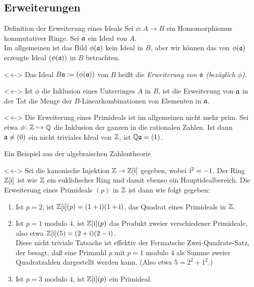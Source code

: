 \subsection{Erweiterungen}

\begin{frame}{Definition der Erweiterung eines Ideals}
	Sei \(\phi\colon A \to B\) ein Homomorphismus kommutativer Ringe.
	Sei \(\mathfrak{a}\) ein Ideal von \(A\).
	\\
	Im allgemeinen ist das Bild \(\phi(\mathfrak{a})\) kein Ideal in \(B\), aber wir 
	können das von \(\phi(\mathfrak{a})\) erzeugte Ideal \((\phi(\mathfrak{a}))\) in
	\(B\) betrachten.
	\begin{definition}<+->
		Das Ideal \(B \mathfrak{a} := (\phi(\mathfrak{a}))\) von \(B\) heißt die
		\emph{Erweiterung von \(\mathfrak{a}\) (bezüglich \(\phi\))}.
	\end{definition}
	\begin{remark}<+->
		Ist \(\phi\) die Inklusion eines Unterringes \(A\) in \(B\), ist die 
		Erweiterung von \(\mathfrak{a}\) in der Tat die Menge der
		\(B\)\nobreakdash-Linearkombinationen von Elementen in \(\mathfrak{a}\).
	\end{remark}
	\begin{example}<+->
		Die Erweiterung eines Primideals ist im allgemeinen nicht mehr prim.
		Sei etwa \(\phi\colon \mathbb Z \hookrightarrow \mathbb Q\) die Inklusion der ganzen in die
		rationalen Zahlen. Ist dann \(\mathfrak{a} \neq (0)\) ein nicht triviales
		Ideal von \(\mathbb Z\), ist \(\mathbb Q \mathfrak{a} = (1)\).
	\end{example}
\end{frame}

\begin{frame}{Ein Beispiel aus der algebraischen Zahlentheorie}
	\begin{example}<+->
		Sei die kanonische Injektion \(\mathbb Z \to \mathbb Z[\mathrm{i}]\) gegeben, wobei \(\mathrm{i}^2 = -1\).
		Der Ring \(\mathbb Z[\mathrm{i}]\) ist wie \(\mathbb Z\) ein euklidischer Ring
		und damit ebenso ein Hauptidealbereich. Die Erweiterung eines
		Primideals \((p)\) in \(\mathbb Z\) ist dann wie folgt gegeben:
		\begin{enumerate}[<+->]
		\item
			Ist \(p = 2\), ist \(\mathbb Z[\mathrm{i}](p) = (1 + \mathrm{i})(1 + \mathrm{i})\), das Quadrat eines
			Primideals in \(\mathbb Z\).
		\item
			Ist \(p = 1\) modulo \(4\), ist \(\mathbb Z[\mathrm{i}](p)\) das Produkt zweier
			verschiedener Primideale, also etwa \(\mathbb Z[\mathrm{i}](5) = (2 + \mathrm{i})(2 - \mathrm{i})\).
			\\
			Diese nicht triviale Tatsache ist effektiv der Fermatsche
			Zwei-Quadrate-Satz, der besagt, daß eine Primzahl \(p\) mit \(p = 1\)
			modulo \(4\) als Summe zweier Quadratzahlen dargestellt werden 
			kann. (Also etwa \(5 = 2^2 + 1^2\).)
		\item
			Ist \(p = 3\) modulo \(4\), ist \(\mathbb Z[\mathrm{i}](p)\) ein Primideal.
		\end{enumerate}
	\end{example}
\end{frame}


